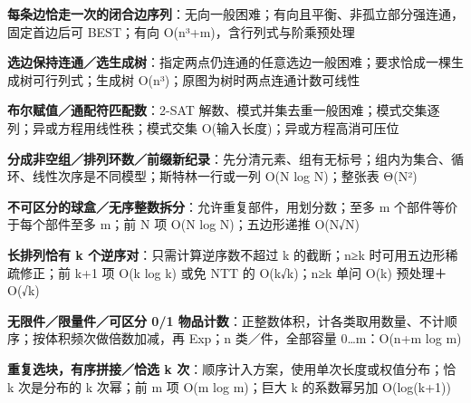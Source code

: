 \documentclass[10pt,a4paper]{article}
\begin{document}
\begin{minipage}{\linewidth}\textbf{每条边恰走一次的闭合边序列}：无向一般困难；有向且平衡、非孤立部分强连通，固定首边后可 BEST；有向 O(n³+m)，含行列式与阶乘预处理\end{minipage}\par\vspace{4pt}
\begin{minipage}{\linewidth}\textbf{选边保持连通／选生成树}：指定两点仍连通的任意选边一般困难；要求恰成一棵生成树可行列式；生成树 O(n³)；原图为树时两点连通计数可线性\end{minipage}\par\vspace{4pt}
\begin{minipage}{\linewidth}\textbf{布尔赋值／通配符匹配数}：2-SAT 解数、模式并集去重一般困难；模式交集逐列；异或方程用线性秩；模式交集 O(输入长度)；异或方程高消可压位\end{minipage}\par\vspace{4pt}
\begin{minipage}{\linewidth}\textbf{分成非空组／排列环数／前缀新纪录}：先分清元素、组有无标号；组内为集合、循环、线性次序是不同模型；斯特林一行或一列 O(N log N)；整张表 Θ(N²)\end{minipage}\par\vspace{4pt}
\begin{minipage}{\linewidth}\textbf{不可区分的球盒／无序整数拆分}：允许重复部件，用划分数；至多 m 个部件等价于每个部件至多 m；前 N 项 O(N log N)；五边形递推 O(N√N)\end{minipage}\par\vspace{4pt}
\begin{minipage}{\linewidth}\textbf{长排列恰有 k 个逆序对}：只需计算逆序数不超过 k 的截断；n≥k 时可用五边形稀疏修正；前 k+1 项 O(k log k) 或免 NTT 的 O(k√k)；n≥k 单问 O(k) 预处理＋O(√k)\end{minipage}\par\vspace{4pt}
\begin{minipage}{\linewidth}\textbf{无限件／限量件／可区分 0/1 物品计数}：正整数体积，计各类取用数量、不计顺序；按体积频次做倍数加减，再 Exp；n 类／件，全部容量 0…m：O(n+m log m)\end{minipage}\par\vspace{4pt}
\begin{minipage}{\linewidth}\textbf{重复选块，有序拼接／恰选 k 次}：顺序计入方案，使用单次长度或权值分布；恰 k 次是分布的 k 次幂；前 m 项 O(m log m)；巨大 k 的系数幂另加 O(log(k+1))\end{minipage}\par\vspace{4pt}
\end{document}
